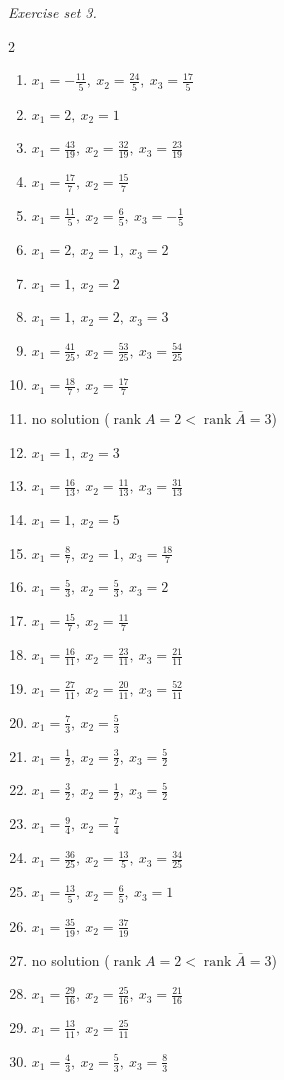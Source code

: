 \par\noindent\emph{Exercise set 3.}\nopagebreak
\begin{multicols}{2}\raggedright
\begin{enumerate}[label=\arabic*., leftmargin=*, itemsep=1pt]
\item $x_1=-\frac{11}{5},\ x_2=\frac{24}{5},\ x_3=\frac{17}{5}$
\item $x_1=2,\ x_2=1$
\item $x_1=\frac{43}{19},\ x_2=\frac{32}{19},\ x_3=\frac{23}{19}$
\item $x_1=\frac{17}{7},\ x_2=\frac{15}{7}$
\item $x_1=\frac{11}{5},\ x_2=\frac{6}{5},\ x_3=-\frac{1}{5}$
\item $x_1=2,\ x_2=1,\ x_3=2$
\item $x_1=1,\ x_2=2$
\item $x_1=1,\ x_2=2,\ x_3=3$
\item $x_1=\frac{41}{25},\ x_2=\frac{53}{25},\ x_3=\frac{54}{25}$
\item $x_1=\frac{18}{7},\ x_2=\frac{17}{7}$
\item no solution ($\operatorname{rank}A=2<\operatorname{rank}\bar A=3$)
\item $x_1=1,\ x_2=3$
\item $x_1=\frac{16}{13},\ x_2=\frac{11}{13},\ x_3=\frac{31}{13}$
\item $x_1=1,\ x_2=5$
\item $x_1=\frac{8}{7},\ x_2=1,\ x_3=\frac{18}{7}$
\item $x_1=\frac{5}{3},\ x_2=\frac{5}{3},\ x_3=2$
\item $x_1=\frac{15}{7},\ x_2=\frac{11}{7}$
\item $x_1=\frac{16}{11},\ x_2=\frac{23}{11},\ x_3=\frac{21}{11}$
\item $x_1=\frac{27}{11},\ x_2=\frac{20}{11},\ x_3=\frac{52}{11}$
\item $x_1=\frac{7}{3},\ x_2=\frac{5}{3}$
\item $x_1=\frac{1}{2},\ x_2=\frac{3}{2},\ x_3=\frac{5}{2}$
\item $x_1=\frac{3}{2},\ x_2=\frac{1}{2},\ x_3=\frac{5}{2}$
\item $x_1=\frac{9}{4},\ x_2=\frac{7}{4}$
\item $x_1=\frac{36}{25},\ x_2=\frac{13}{5},\ x_3=\frac{34}{25}$
\item $x_1=\frac{13}{5},\ x_2=\frac{6}{5},\ x_3=1$
\item $x_1=\frac{35}{19},\ x_2=\frac{37}{19}$
\item no solution ($\operatorname{rank}A=2<\operatorname{rank}\bar A=3$)
\item $x_1=\frac{29}{16},\ x_2=\frac{25}{16},\ x_3=\frac{21}{16}$
\item $x_1=\frac{13}{11},\ x_2=\frac{25}{11}$
\item $x_1=\frac{4}{3},\ x_2=\frac{5}{3},\ x_3=\frac{8}{3}$
\end{enumerate}
\end{multicols}
